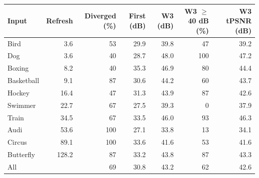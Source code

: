 \begin{tabular}{lrrrrrr}
\toprule
Input & Refresh & Diverged (\%) & First (dB) & W3 (dB) & W3 $\geq$ 40 dB (\%) & W3 tPSNR (dB) \\
\midrule
Bird & 3.6 & 53 & 29.9 & 39.8 & 47 & 39.2 \\
Dog & 3.6 & 40 & 28.7 & 48.0 & 100 & 47.2 \\
Boxing & 8.2 & 40 & 35.3 & 46.9 & 80 & 44.4 \\
Basketball & 9.1 & 87 & 30.6 & 44.2 & 60 & 43.7 \\
Hockey & 16.4 & 47 & 31.3 & 43.9 & 87 & 42.6 \\
Swimmer & 22.7 & 67 & 27.5 & 39.3 & 0 & 37.9 \\
Train & 34.5 & 67 & 33.5 & 46.0 & 93 & 46.3 \\
Audi & 53.6 & 100 & 27.1 & 33.8 & 13 & 34.1 \\
Circus & 89.1 & 100 & 33.6 & 41.6 & 53 & 41.6 \\
Butterfly & 128.2 & 87 & 33.2 & 43.8 & 87 & 43.3 \\
\midrule
All & & 69 & 30.8 & 43.2 & 62 & 42.6 \\
\bottomrule
\end{tabular}
